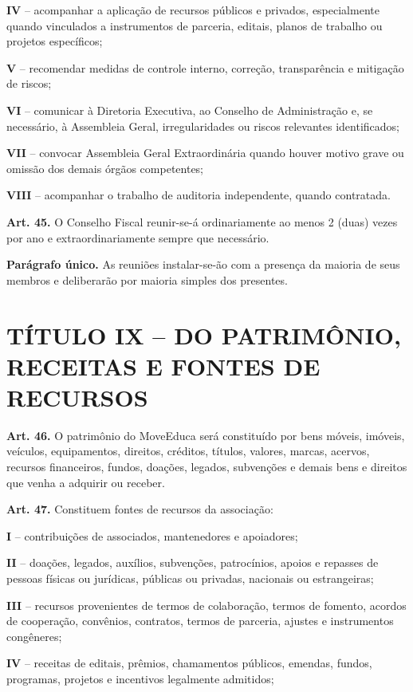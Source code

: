 \documentclass[11pt,a4paper]{article}
\begin{document}
\textbf{IV} -- acompanhar a aplicação de recursos públicos e privados, especialmente quando vinculados a instrumentos de parceria, editais, planos de trabalho ou projetos específicos;

\textbf{V} -- recomendar medidas de controle interno, correção, transparência e mitigação de riscos;

\textbf{VI} -- comunicar à Diretoria Executiva, ao Conselho de Administração e, se necessário, à Assembleia Geral, irregularidades ou riscos relevantes identificados;

\textbf{VII} -- convocar Assembleia Geral Extraordinária quando houver motivo grave ou omissão dos demais órgãos competentes;

\textbf{VIII} -- acompanhar o trabalho de auditoria independente, quando contratada.

\textbf{Art. 45.} O Conselho Fiscal reunir-se-á ordinariamente ao menos 2 (duas) vezes por ano e extraordinariamente sempre que necessário.

\textbf{Parágrafo único.} As reuniões instalar-se-ão com a presença da maioria de seus membros e deliberarão por maioria simples dos presentes.

\section*{TÍTULO IX -- DO PATRIMÔNIO, RECEITAS E FONTES DE RECURSOS}

\textbf{Art. 46.} O patrimônio do MoveEduca será constituído por bens móveis, imóveis, veículos, equipamentos, direitos, créditos, títulos, valores, marcas, acervos, recursos financeiros, fundos, doações, legados, subvenções e demais bens e direitos que venha a adquirir ou receber.

\textbf{Art. 47.} Constituem fontes de recursos da associação:

\textbf{I} -- contribuições de associados, mantenedores e apoiadores;

\textbf{II} -- doações, legados, auxílios, subvenções, patrocínios, apoios e repasses de pessoas físicas ou jurídicas, públicas ou privadas, nacionais ou estrangeiras;

\textbf{III} -- recursos provenientes de termos de colaboração, termos de fomento, acordos de cooperação, convênios, contratos, termos de parceria, ajustes e instrumentos congêneres;

\textbf{IV} -- receitas de editais, prêmios, chamamentos públicos, emendas, fundos, programas, projetos e incentivos legalmente admitidos;
\end{document}
